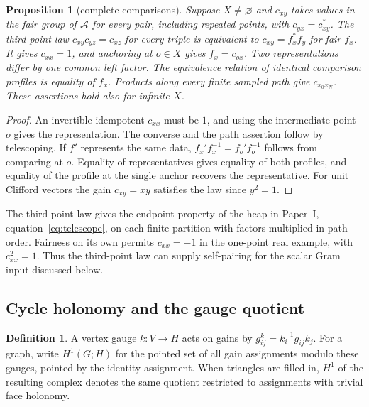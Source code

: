 \documentclass[11pt,reqno]{amsart}
\newtheorem{proposition}[theorem]{Proposition}
\theoremstyle{definition}
\newtheorem{definition}[theorem]{Definition}
\theoremstyle{remark}
\numberwithin{equation}{section}
\begin{document}
\begin{proposition}[complete comparisons]\label{m1:complete}
Suppose \(X\ne\varnothing\) and \(c_{xy}\) takes values in the
fair group of \(\mathcal A\) for every pair, including repeated
points, with \(c_{yx}=c_{xy}^*\).
The third-point law \(c_{xy}c_{yz}=c_{xz}\) for every triple
is equivalent to \(c_{xy}=f_x^*f_y\) for fair \(f_x\).
It gives \(c_{xx}=1\), and anchoring at \(o\in X\) gives
\(f_x=c_{ox}\). Two representations differ by one common
left factor. The equivalence relation of identical comparison
profiles is equality of \(f_x\). Products along every finite
sampled path give \(c_{x_0x_N}\). These assertions hold also
for infinite \(X\).
\end{proposition}
\begin{proof}
An invertible idempotent \(c_{xx}\) must be \(1\), and using
the intermediate point \(o\) gives the representation. The converse
and the path assertion follow by telescoping. If \(f'\) represents
the same data, \(f_x'f_x^{-1}=f_o'f_o^{-1}\) follows from comparing
at \(o\). Equality of representatives gives equality of both profiles,
and equality of the profile at the single anchor recovers the
representative. For unit Clifford vectors the gain \(c_{xy}=xy\)
satisfies the law since \(y^2=1\).
\end{proof}

The third-point law gives the endpoint property of the heap in
Paper~I, equation~\eqref{eq:telescope}, on each finite partition with factors
multiplied in path order. Fairness on its own permits
\(c_{xx}=-1\) in the one-point real example, with \(c_{xx}^2=1\).
Thus the third-point law can supply self-pairing for the scalar
Gram input discussed below.

\subsection{Cycle holonomy and the gauge quotient}

\begin{definition}\label{m1:gauge-def}
A vertex gauge \(k:V\to H\) acts on gains by
\(g^k_{ij}=k_i^{-1}g_{ij}k_j\).
For a graph, write \(H^1(G;H)\) for the pointed set of all
gain assignments modulo these gauges, pointed by the identity
assignment. When triangles are filled in, \(H^1\) of the
resulting complex denotes the same quotient restricted to
assignments with trivial face holonomy.
\end{definition}
\end{document}
